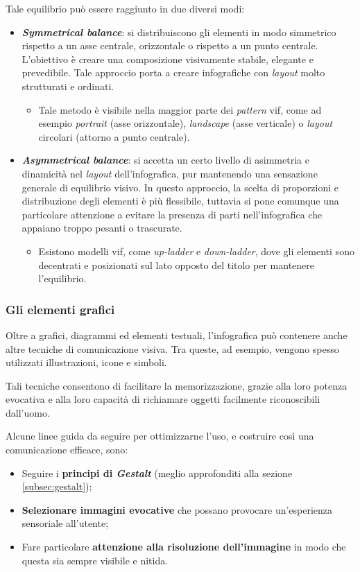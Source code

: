 Tale equilibrio può essere raggiunto in due diversi modi:
\begin{itemize}
    \item \textbf{\emph{Symmetrical balance}}: si distribuiscono gli elementi in modo simmetrico rispetto a un asse centrale, orizzontale o rispetto a un punto centrale. L'obiettivo è creare una composizione visivamente stabile, elegante e prevedibile.
    Tale approccio porta a creare infografiche con \emph{layout} molto strutturati e ordinati.
    \begin{itemize}
        \item Tale metodo è visibile nella maggior parte dei \emph{pattern} \gls{vif}, come ad esempio \emph{portrait} (asse orizzontale), \emph{landscape} (asse verticale) o \emph{layout} circolari (attorno a punto centrale).
    \end{itemize}
    \item \textbf{\emph{Asymmetrical balance}}: si accetta un certo livello di asimmetria e dinamicità nel \emph{layout} dell'infografica, pur mantenendo una sensazione generale di equilibrio visivo. In questo approccio, la scelta di proporzioni e distribuzione
    degli elementi è più flessibile, tuttavia si pone comunque una particolare attenzione a evitare la presenza di parti nell'infografica che appaiano troppo pesanti o trascurate.
    \begin{itemize}
        \item Esistono modelli \gls{vif}, come \emph{up-ladder} e \emph{down-ladder}, dove gli elementi sono decentrati e posizionati sul lato opposto del titolo per mantenere l'equilibrio.
    \end{itemize}
\end{itemize}


\subsubsection{Gli elementi grafici}
Oltre a grafici, diagrammi ed elementi testuali, l'infografica può contenere anche altre tecniche di comunicazione visiva. Tra queste, ad esempio, vengono spesso utilizzati
illustrazioni, icone e simboli.

Tali tecniche consentono di facilitare la memorizzazione, grazie alla loro potenza evocativa e alla loro capacità di richiamare oggetti facilmente riconoscibili dall'uomo.

\bigskip
\noindent Alcune linee guida da seguire per ottimizzarne l'uso, e costruire così una comunicazione efficace, sono:
\begin{itemize}
    \item Seguire i \textbf{principi di \emph{Gestalt}} (meglio approfonditi alla sezione \ref{subsec:gestalt});
    \item \textbf{Selezionare immagini evocative} che possano provocare un'esperienza sensoriale all'utente;
    \item Fare particolare \textbf{attenzione alla risoluzione dell'immagine} in modo che questa sia sempre visibile e nitida.
\end{itemize}

